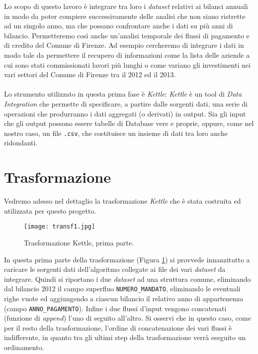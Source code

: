 	Lo scopo di questo lavoro è integrare tra loro i \textit{dataset} relativi ai bilanci annuali in modo da poter compiere successivamente delle analisi che non siano ristrette ad un singolo anno, ma che possano confrontare anche i dati su più anni di bilancio. Permetteremo così anche un'analisi temporale dei flussi di pagamento e di credito del Comune di Firenze. Ad esempio cercheremo di integrare i dati in modo tale da permettere il recupero di informazioni come la lista delle aziende a cui sono stati commissionati lavori più lunghi o come variano gli investimenti nei vari settori del Comune di Firenze tra il 2012 ed il 2013.\\
	\\
	Lo strumento utilizzato in questa prima fase è \textit{Kettle}: \textit{Kettle} è un tool di \textit{Data Integration} che permette di specificare, a partire dalle sorgenti dati, una serie di operazioni che produrranno i dati aggregati (o derivati) in output. Sia gli input che gli output possono essere tabelle di Database vere e proprie, oppure, come nel nostro caso, un file \texttt{.csv}, che costituisce un insieme di dati tra loro anche ridondanti.\\
	
	\section{Trasformazione} \label{sec:trasformazione}
		
		Vedremo adesso nel dettaglio la trasformazione \textit{Kettle} che è stata costruita ed utilizzata per questo progetto.
		
		
		\begin{figure}[h!]
			\centering
				\texttt{[image: transf1.jpg]}
			\caption{Trasformazione Kettle, prima parte.}
			\label{fig:transf1}
		\end{figure}
		
		In questa prima parte della trasformazione (Figura \ref{fig:transf1}) si provvede innanzitutto a caricare le sorgenti dati dell'algoritmo collegate ai file dei vari \textit{dataset} da integrare. Quindi si riportano i due \textit{dataset} ad una struttura comune, eliminando dal bilancio 2012 il campo superfluo \texttt{NUMERO\_MANDATO}, eliminando le eventuali righe vuote ed aggiungendo a ciascun bilancio il relativo anno di appartenenza (campo \texttt{ANNO\_PAGAMENTO}). Infine i due flussi d'input vengono concatenati (funzione di \textit{append}) l'uno di seguito all'altro. Si osservi che in questo caso, come per il resto della trasformazione, l'ordine di concatenazione dei vari flussi è indifferente, in quanto tra gli ultimi step della trasformazione verrà eseguito un ordinamento.\\
		
